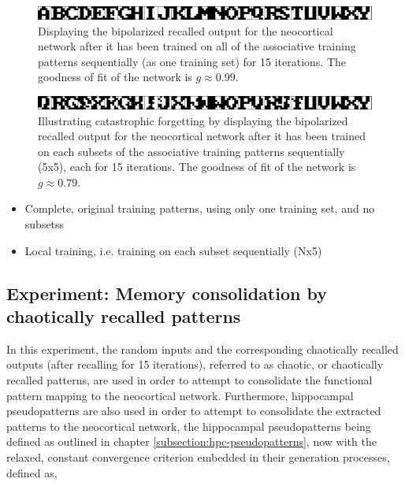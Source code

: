 \begin{figure}
    \centering
    \includegraphics[width=12cm]{fig/neo-intro-demo/global_aggregate_im}
    \caption{Displaying the bipolarized recalled output for the neocortical network after it has been trained on all of the associative training patterns sequentially (as one training set) for 15 iterations. The goodness of fit of the network is $g\approx0.99$.}
    \label{fig:global_aggregate_im}
\end{figure}

\begin{figure}
    \centering
    \includegraphics[width=12cm]{fig/neo-intro-demo/local_aggregate_im}
    \caption{Illustrating catastrophic forgetting by displaying the bipolarized recalled output for the neocortical network after it has been trained on each subsets of the associative training patterns sequentially (5x5), each for 15 iterations. The goodness of fit of the network is $g\approx0.79$.}
    \label{fig:local_aggregate_im}
\end{figure}

\begin{itemize}
    \item Complete, original training patterns, using only one training set, and no subsetss
    \item Local training, i.e. training on each subset sequentially (Nx5)
\end{itemize}

\subsection{Experiment: Memory consolidation by chaotically recalled patterns}\label{subsect:rand-in-chaotic-out}

In this experiment, the random inputs and the corresponding chaotically recalled outputs (after recalling for 15 iterations), referred to as chaotic, or chaotically recalled patterns, are used in order to attempt to consolidate the functional pattern mapping to the neocortical network. Furthermore, hippocampal pseudopatterns are also used in order to attempt to consolidate the extracted patterns to the neocortical network, the hippocampal pseudopatterns being defined as outlined in chapter \ref{subsection:hpc-pseudopatterns}, now with the relaxed, constant convergence criterion embedded in their generation processes, defined as,

